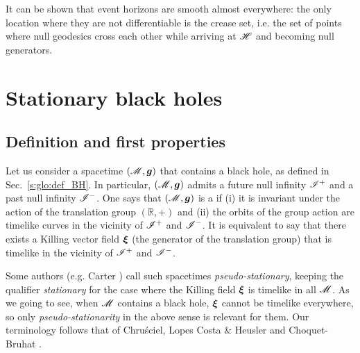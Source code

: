 It can be shown that event horizons are smooth almost everywhere: the only
location where they are not differentiable is the crease set, i.e. the set of points
where null geodesics cross each other while arriving at $\mathscr{H}$ and becoming null
generators.


\section{Stationary black holes} \label{s:glo:stationary}

\subsection{Definition and first properties} \label{s:glo:def_station}

Let us consider a spacetime $(\mathscr{M},\bm{g})$ that contains a black hole, as defined in
Sec.~\ref{s:glo:def_BH}. In particular, $(\mathscr{M},\bm{g})$ admits a future null
infinity $\mathscr{I}^+$ and a past null infinity $\mathscr{I}^-$. One says that
$(\mathscr{M},\bm{g})$ is a 
if (i) it is invariant under
the action of the translation group $(\mathbb{R},+)$ and (ii) the orbits of
the group action are timelike curves in the vicinity of $\mathscr{I}^+$ and
$\mathscr{I}^-$. It is equivalent to say that there exists a Killing vector field
$\bm{\xi}$ (the generator of the translation group) that is timelike in the vicinity of $\mathscr{I}^+$ and $\mathscr{I}^-$.

\begin{remark}
Some authors (e.g. Carter \cite{Carte73b}) call such spacetimes
\emph{pseudo-stationary}, keeping the qualifier
\emph{stationary} for the case where the Killing field $\bm{\xi}$ is timelike
in all $\mathscr{M}$. As we going to see, when $\mathscr{M}$
contains a black hole, $\bm{\xi}$ cannot be timelike everywhere,
so only \emph{pseudo-stationarity} in the above sense is relevant for them.
Our terminology follows that of Chru\'sciel, Lopes Costa \& Heusler \cite{ChrusLH12}
and Choquet-Bruhat \cite{Choqu09}.
\end{remark}

